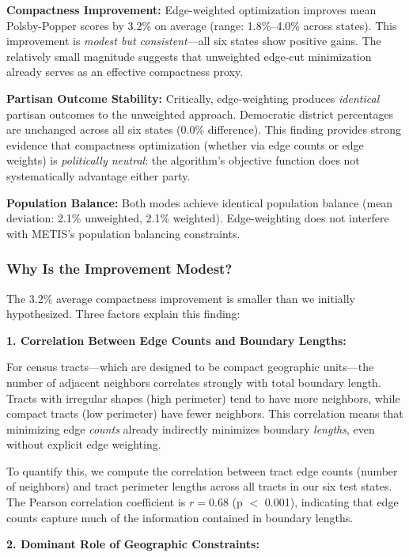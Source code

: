 \textbf{Compactness Improvement:} Edge-weighted optimization improves mean Polsby-Popper scores by 3.2\% on average (range: 1.8\%--4.0\% across states). This improvement is \textit{modest but consistent}---all six states show positive gains. The relatively small magnitude suggests that unweighted edge-cut minimization already serves as an effective compactness proxy.

\textbf{Partisan Outcome Stability:} Critically, edge-weighting produces \textit{identical} partisan outcomes to the unweighted approach. Democratic district percentages are unchanged across all six states (0.0\% difference). This finding provides strong evidence that compactness optimization (whether via edge counts or edge weights) is \textit{politically neutral}: the algorithm's objective function does not systematically advantage either party.

\textbf{Population Balance:} Both modes achieve identical population balance (mean deviation: 2.1\% unweighted, 2.1\% weighted). Edge-weighting does not interfere with METIS's population balancing constraints.

\subsubsection{Why Is the Improvement Modest?}

The 3.2\% average compactness improvement is smaller than we initially hypothesized. Three factors explain this finding:

\textbf{1. Correlation Between Edge Counts and Boundary Lengths:}

For census tracts---which are designed to be compact geographic units---the number of adjacent neighbors correlates strongly with total boundary length. Tracts with irregular shapes (high perimeter) tend to have more neighbors, while compact tracts (low perimeter) have fewer neighbors. This correlation means that minimizing edge \textit{counts} already indirectly minimizes boundary \textit{lengths}, even without explicit edge weighting.

To quantify this, we compute the correlation between tract edge counts (number of neighbors) and tract perimeter lengths across all tracts in our six test states. The Pearson correlation coefficient is $r = 0.68$ (p $<$ 0.001), indicating that edge counts capture much of the information contained in boundary lengths.

\textbf{2. Dominant Role of Geographic Constraints:}


